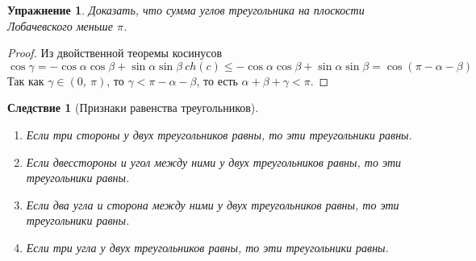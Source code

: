\documentclass[12pt]{article}
\newcommand\tab[1][.5cm]{\hspace*{#1}}
\theoremstyle{plain}
\newtheorem{consequence}{Следствие}[theorem]
\newtheorem*{exercise}{Упражнение}
\begin{document}
    \begin{exercise}
        Доказать, что сумма углов треугольника на плоскости Лобачевского меньше $\pi$.
    \end{exercise}
    \begin{proof}
        Из двойственной теоремы косинусов $$\cos\gamma=-\cos\alpha\cos\beta+\sin\alpha\sin\beta \ ch(c)\leqslant-\cos\alpha\cos\beta+\sin\alpha\sin\beta=\cos(\pi-\alpha-\beta)$$
        Так как $\gamma\in(0, \ \pi)$, то $\gamma<\pi-\alpha-\beta$, то есть $\alpha+\beta+\gamma<\pi$.
    \end{proof}
    \begin{consequence}[Признаки равенства треугольников]\tab
        \begin{enumerate}
            \item Если три стороны у двух треугольников равны, то эти треугольники равны.
            \item Если двесстороны и угол между ними у двух треугольников равны, то эти треугольники равны.
            \item Если два угла и сторона между ними у двух треугольников равны, то эти треугольники равны.
            \item Если три угла у двух треугольников равны, то эти треугольники равны.
        \end{enumerate}
    \end{consequence}
\end{document}
